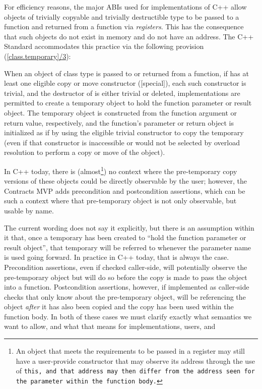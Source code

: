 For efficiency reasons, the major ABIs used for implementations of C++ allow objects of trivially copyable and trivially destructible type to be passed to a function and returned from a function via \emph{registers}. This has the consequence that such objects do not exist in memory and do not have an address. The C++ Standard accommodates this practice via the following provision (\href{https://timsong-cpp.github.io/cppwp/n4950/class.temporary#3}{[class.temporary]/3}):

\begin{adjustwidth}{0.5cm}{0.5cm}
When an object of class type  is passed to or returned from a function, if  has at least one eligible copy or move constructor ([special]), each such constructor is trivial, and the destructor of  is either trivial or deleted, implementations are permitted to create a temporary object to hold the function parameter or result object. The temporary object is constructed from the function argument or return value, respectively, and the function's parameter or return object is initialized as if by using the eligible trivial constructor to copy the temporary (even if that constructor is inaccessible or would not be selected by overload resolution to perform a copy or move of the object).
\end{adjustwidth}

In C++ today, there is (almost\footnote{An object that meets the requirements to be passed in a register may still have a user-provide constructor that may observe its address through the use of \tt{this}, and that address may then differ from the address seen for the parameter within the function body.}) no context where the pre-temporary copy versions of these objects could be directly observable by the user; however, the Contracts MVP \cite{P2900R10} adds precondition and postcondition assertions, which can be such a context where that pre-temporary object is not only observable, but usable by name.

The current wording does not say it explicitly, but there is an assumption within it that, once a temporary has been created to ``hold the function parameter or result object'', that temporary will be referred to whenever the parameter name is used going forward.   In practice in C++ today, that is always the case.    Precondition assertions, even if checked caller-side, will potentially observe the pre-temporary object but will do so before the copy is made to pass the object into a function.   Postcondition assertions, however, if implemented as caller-side checks that only know about the pre-temporary object, will be referencing the object \emph{after} it has also been copied and the copy has been used within the function body.
In both of these cases we must clarify exactly what semantics we want to allow, and what that means for implementations, users, and 

